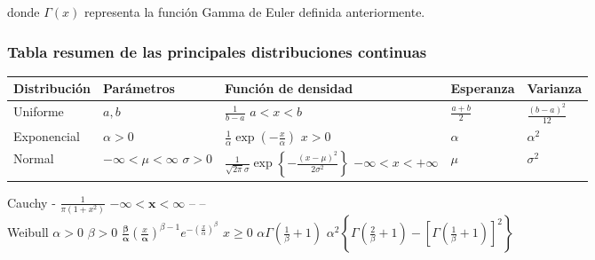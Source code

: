 \documentclass[
]{article}
\begin{document}
donde \(\Gamma(x)\) representa la función Gamma de Euler definida anteriormente.

\subsubsection{Tabla resumen de las principales distribuciones continuas}\label{tabla-resumen-de-las-principales-distribuciones-continuas}

\begin{longtable}[]{@{}
  >{\centering\arraybackslash}p{}
  >{\centering\arraybackslash}p{}
  >{\centering\arraybackslash}p{}
  >{\centering\arraybackslash}p{}
  >{\centering\arraybackslash}p{}@{}}
\toprule\noalign{}
\begin{minipage}[b]{\linewidth}\centering
Distribución
\end{minipage} & \begin{minipage}[b]{\linewidth}\centering
Parámetros
\end{minipage} & \begin{minipage}[b]{\linewidth}\centering
Función de densidad
\end{minipage} & \begin{minipage}[b]{\linewidth}\centering
Esperanza
\end{minipage} & \begin{minipage}[b]{\linewidth}\centering
Varianza
\end{minipage} \\
\midrule\noalign{}
\endhead
\bottomrule\noalign{}
\endlastfoot
Uniforme & \(a, b\) & \(\frac{1}{b-a}\) \(a<x<b\) & \(\frac{a+b}{2}\) & \(\frac{(b-a)^{2}}{12}\) \\
Exponencial & \(\alpha>0\) & \(\frac{1}{\alpha} \exp \left(-\frac{x}{\alpha}\right)\) \(x>0\) & \(\alpha\) & \(\alpha^{2}\) \\
Normal & \(-\infty<\mu<\infty\) \(\sigma>0\) & \(\frac{1}{\sqrt{2 \pi} \sigma} \exp \left\{-\frac{(x-\mu)^{2}}{2 \sigma^{2}}\right\}\) \(-\infty<x<+\infty\) & \(\mu\) & \(\sigma^{2}\) \\
\end{longtable}

Cauchy \textbar{} - \textbar{} \(\frac{1}{\pi\left(1+x^{2}\right)}\) \(-\infty<\mathbf{x}<\infty\) \textbar{} -- \textbar{} -- \textbar{}\\
Weibull \textbar{} \(\alpha>0\) \(\beta>0\) \textbar{} \(\frac{\boldsymbol{\beta}}{\boldsymbol{\alpha}}\left(\frac{x}{\boldsymbol{\alpha}}\right)^{\beta-1} e^{-\left(\frac{x}{\alpha}\right)^{\beta}}\) \(x \geq 0\) \textbar{} \(\alpha \Gamma\left(\frac{1}{\beta}+1\right)\) \textbar{} \(\alpha^{2}\left\{\Gamma\left(\frac{2}{\beta}+1\right)-\left[\Gamma\left(\frac{1}{\beta}+1\right)\right]^{2}\right\}\) \textbar{}
\end{document}
